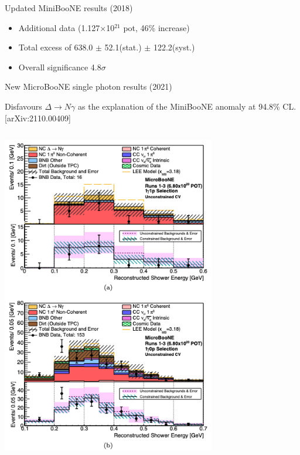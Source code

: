 \begin{frame}[t]{Updated MiniBooNE results (2018)}
  \begin{itemize}
    \item Additional data (1.127$\times$10$^{21}$ pot, 46\% increase)
    \item Total excess of 638.0 $\pm$ 52.1(stat.) $\pm$ 122.2(syst.)
    \item Overall significance 4.8$\sigma$
  \end{itemize}
\end{frame}


%
%
%

\begin{frame}[t]{New MicroBooNE single photon results (2021)}

{\small
Disfavours $\Delta \rightarrow N \gamma$ as the explanation of the MiniBooNE anomaly at 94.8\% CL.\\
{\scriptsize \color{blue}[arXiv:2110.00409]}\\
}
\vspace{-0.3cm}
\begin{columns}[T]
    \begin{column}{0.50\textwidth}
    \begin{center}
      \includegraphics[width=0.70\textwidth]{./images/beyond3nu/accelerator/uB_2021_gamma_0}
    \end{center}

\end{column}
\end{columns}
\end{frame}
